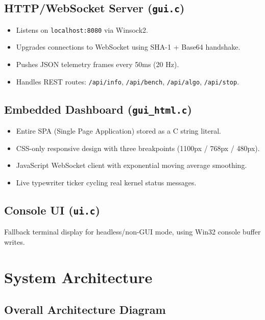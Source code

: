 \documentclass[12pt,a4paper]{article}
\begin{document}
\subsection{HTTP/WebSocket Server (\texttt{gui.c})}

\begin{itemize}
  \item Listens on \texttt{localhost:8080} via Winsock2.
  \item Upgrades connections to WebSocket using SHA-1 + Base64 handshake.
  \item Pushes JSON telemetry frames every 50ms (20 Hz).
  \item Handles REST routes: \texttt{/api/info}, \texttt{/api/bench}, \texttt{/api/algo}, \texttt{/api/stop}.
\end{itemize}

\subsection{Embedded Dashboard (\texttt{gui\_html.c})}

\begin{itemize}
  \item Entire SPA (Single Page Application) stored as a C string literal.
  \item CSS-only responsive design with three breakpoints (1100px / 768px / 480px).
  \item JavaScript WebSocket client with exponential moving average smoothing.
  \item Live typewriter ticker cycling real kernel status messages.
\end{itemize}

\subsection{Console UI (\texttt{ui.c})}

Fallback terminal display for headless/non-GUI mode, using Win32 console buffer writes.

\section{System Architecture}

\subsection{Overall Architecture Diagram}
\end{document}

